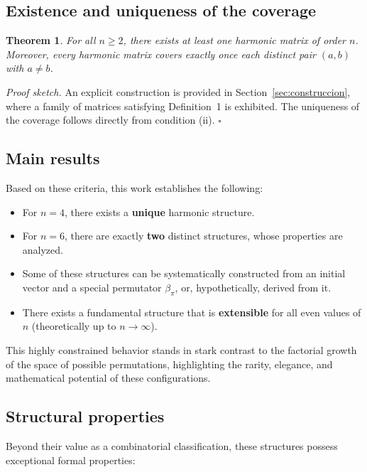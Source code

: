 \documentclass{article}
\newtheorem{theorem}{Theorem}[section]
\begin{document}
\subsection{Existence and uniqueness of the coverage}

\begin{theorem}
For all \(n \ge 2\), there exists at least one harmonic matrix of order \(n\).  
Moreover, every harmonic matrix covers \emph{exactly once} each distinct pair \((a, b)\) with \(a \neq b\).
\end{theorem}

\smallskip
\noindent\textit{Proof sketch.}  
An explicit construction is provided in Section~\ref{sec:construccion}, where a family of matrices satisfying Definition~1 is exhibited.  
The uniqueness of the coverage follows directly from condition (ii). \hfill\(\square\)

\subsection{Main results}

Based on these criteria, this work establishes the following:

\begin{itemize}
    \item For \(n = 4\), there exists a \textbf{unique} harmonic structure.
    \item For \(n = 6\), there are exactly \textbf{two} distinct structures, whose properties are analyzed.
    \item Some of these structures can be systematically constructed from an initial vector and a special permutator \(\beta_\pi\), or, hypothetically, derived from it.
    \item There exists a fundamental structure that is \textbf{extensible} for all even values of \(n\) (theoretically up to \(n \to \infty\)).
\end{itemize}

This highly constrained behavior stands in stark contrast to the factorial growth of the space of possible permutations, highlighting the rarity, elegance, and mathematical potential of these configurations.


\subsection{Structural properties}

Beyond their value as a combinatorial classification, these structures possess exceptional formal properties:
\end{document}

